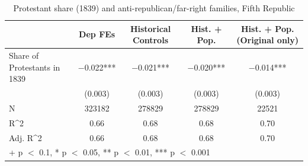 \begin{table}
\centering
\caption{Protestant share (1839) and anti-republican/far-right families, Fifth Republic}
\centering
\begin{tabular}[t]{lcccc}
\toprule
  & Dep FEs & Historical Controls & Hist. + Pop. & Hist. + Pop. (Original only)\\
\midrule
Share of Protestants in 1839 & \num{-0.022}*** & \num{-0.021}*** & \num{-0.020}*** & \num{-0.014}***\\
 & (\num{0.003}) & (\num{0.003}) & (\num{0.003}) & (\num{0.003})\\
\midrule
N & \num{323182} & \num{278829} & \num{278829} & \num{22521}\\
R\textasciicircum{}2 & \num{0.66} & \num{0.68} & \num{0.68} & \num{0.70}\\
Adj. R\textasciicircum{}2 & \num{0.66} & \num{0.68} & \num{0.68} & \num{0.70}\\
\bottomrule
\multicolumn{5}{l}{\rule{0pt}{1em}+ p $<$ 0.1, * p $<$ 0.05, ** p $<$ 0.01, *** p $<$ 0.001}\\
\end{tabular}
\end{table}
